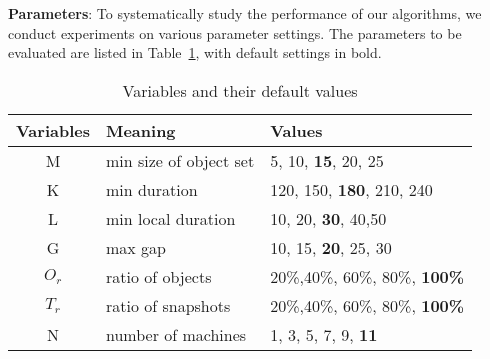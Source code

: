 \textbf{Parameters}: To systematically study the performance of
our algorithms, we conduct experiments on various parameter settings. The parameters to be evaluated are listed in Table~\ref{tbl:parameters}, with default settings in bold. 
\begin{table}[h]
\small
\begin{tabular}{c|l|l}
\hline 
\textbf{Variables} & \textbf{Meaning} & \textbf{Values} \\ 
\hline 
M & min size of object set &  5, 10,  \textbf{15}, 20, 25 \\ 
\hline 
K & min duration & 120, 150, \textbf{180}, 210, 240 \\ 
\hline 
L & min local duration & 10, 20, \textbf{30}, 40,50 \\ 
\hline 
G & max gap & 10, 15, \textbf{20}, 25, 30 \\ 
\hline
$O_r$ & ratio of objects & 20\%,40\%, 60\%, 80\%, \textbf{100\%} \\ \hline
$T_r$ & ratio of snapshots & 20\%,40\%, 60\%, 80\%, \textbf{100\%} \\ \hline
N & number of machines & 1, 3, 5, 7, 9, \textbf{11}\\ 
\hline 
\end{tabular} 
\caption{Variables and their default values}
\label{tbl:parameters}
\end{table}

